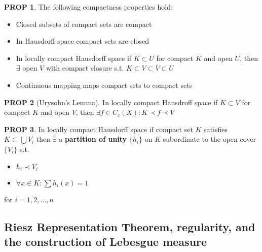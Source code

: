 \documentclass[hidelinks,10pt]{article}
\theoremstyle{definition}
\theoremstyle{dotles}
\theoremstyle{dotless}
\newtheorem{proposition}{PROP}[section]
\theoremstyle{remark}
\begin{document}
\begin{proposition}The following compactness properties hold:
\begin{itemize}
    \item Closed subsets of compact sets are compact
    \item In Hausdorff space compact sets are closed
    \item In locally compact Hausdorff space if $K\subset U$ for compact $K$ and open $U$, then $\exists$ open $V$ with compact closure s.t. $K\subset V\subset\overline{V}\subset U$
    \item Continuous mapping maps compact sets to compact sets
\end{itemize}
\end{proposition}

\begin{proposition}[Urysohn's Lemma] In locally compact Hausdroff space if $K\subset V$ for compact $K$ and open $V$, then $\exists f\in C_c(X):K\prec f\prec V$
\end{proposition}

\begin{proposition}In locally compact Hausdorff space if compact set $K$ satisfies $K\subset\bigcup V_i$ then $\exists$ a \textbf{partition of unity} $\{h_i\}$ on $K$ subordinate to the open cover $\{V_i\}$ s.t.\begin{itemize}
    \item $h_i\prec V_i$
    \item $\forall x\in K:\sum h_i(x)=1$
\end{itemize}
for $i=1,2,...,n$
\end{proposition}

\subsection{Riesz Representation Theorem, regularity, and the construction of Lebesgue measure}
\end{document}

